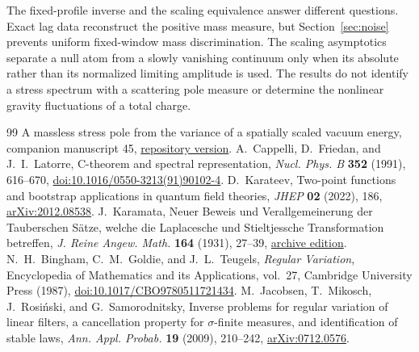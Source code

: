 \documentclass[11pt]{article}
\theoremstyle{remark}
\begin{document}
The fixed-profile inverse and the scaling equivalence answer
different questions. Exact lag data reconstruct the positive
mass measure, but Section~\ref{sec:noise} prevents uniform
fixed-window mass discrimination. The scaling asymptotics
separate a null atom from a slowly vanishing continuum only
when its absolute rather than its normalized limiting
amplitude is used. The results do not identify a stress spectrum
with a scattering pole measure or determine the nonlinear
gravity fluctuations of a total charge.

\begin{thebibliography}{99}
\small
{}
A massless stress pole from the variance of a spatially scaled vacuum energy,
companion manuscript 45,
\href{https://github.com/g3173028019-beep/ai-automated-quantum-gravity-research/tree/main/papers/45-vacuum-stress-massless-pole}{repository version}.
A.~Cappelli, D.~Friedan, and J.~I.~Latorre,
C-theorem and spectral representation,
\emph{Nucl. Phys. B} \textbf{352} (1991), 616--670,
\href{https://doi.org/10.1016/0550-3213(91)90102-4}{doi:10.1016/0550-3213(91)90102-4}.
D.~Karateev, Two-point functions and bootstrap applications in quantum field theories,
\emph{JHEP} \textbf{02} (2022), 186,
\href{https://arxiv.org/abs/2012.08538}{arXiv:2012.08538}.
J.~Karamata, Neuer Beweis und Verallgemeinerung der Tauberschen S\"atze, welche die Laplacesche und Stieltjessche Transformation betreffen,
\emph{J. Reine Angew. Math.} \textbf{164} (1931), 27--39,
\href{https://geodesic.mathdoc.fr/item/JRAM_1931__164_149745/}{archive edition}.
N.~H.~Bingham, C.~M.~Goldie, and J.~L.~Teugels,
\emph{Regular Variation}, Encyclopedia of Mathematics and its Applications, vol.~27, Cambridge University Press (1987),
\href{https://doi.org/10.1017/CBO9780511721434}{doi:10.1017/CBO9780511721434}.
M.~Jacobsen, T.~Mikosch, J.~Rosi\'nski, and G.~Samorodnitsky,
Inverse problems for regular variation of linear filters, a cancellation property for \(\sigma\)-finite measures, and identification of stable laws,
\emph{Ann. Appl. Probab.} \textbf{19} (2009), 210--242,
\href{https://arxiv.org/abs/0712.0576}{arXiv:0712.0576}.
\end{thebibliography}
\end{document}
